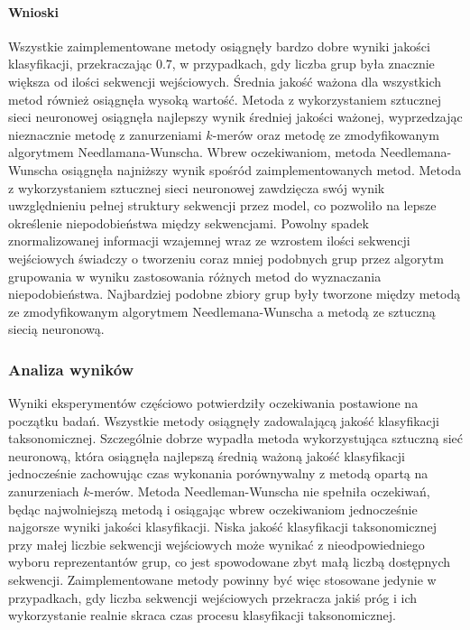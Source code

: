             \paragraph{Wnioski}
                Wszystkie zaimplementowane metody osiągnęły bardzo dobre wyniki jakości klasyfikacji, przekraczając $0.7$, w przypadkach, gdy liczba grup była znacznie większa od ilości sekwencji wejściowych. Średnia jakość ważona dla wszystkich metod również osiągnęła wysoką wartość.
                Metoda z wykorzystaniem sztucznej sieci neuronowej osiągnęła najlepszy wynik średniej jakości ważonej, wyprzedzając nieznacznie metodę z zanurzeniami $k$-merów oraz metodę ze zmodyfikowanym algorytmem Needlamana-Wunscha. Wbrew oczekiwaniom, metoda Needlemana-Wunscha osiągnęła najniższy wynik spośród zaimplementowanych metod.
                Metoda z wykorzystaniem sztucznej sieci neuronowej zawdzięcza swój wynik uwzględnieniu pełnej struktury sekwencji przez model, co pozwoliło na lepsze określenie niepodobieństwa między sekwencjami.
                Powolny spadek znormalizowanej informacji wzajemnej wraz ze wzrostem ilości sekwencji wejściowych świadczy o tworzeniu coraz mniej podobnych grup przez algorytm grupowania w wyniku zastosowania różnych metod do wyznaczania niepodobieństwa. Najbardziej podobne zbiory grup były tworzone między metodą ze zmodyfikowanym algorytmem Needlemana-Wunscha a metodą ze sztuczną siecią neuronową.

        \subsubsection{Analiza wyników}

            Wyniki eksperymentów częściowo potwierdziły oczekiwania postawione na początku badań. Wszystkie metody osiągnęły zadowalającą jakość klasyfikacji taksonomicznej. Szczególnie dobrze wypadła metoda wykorzystująca sztuczną sieć neuronową, która osiągnęła najlepszą średnią ważoną jakość klasyfikacji jednocześnie zachowując czas wykonania porównywalny z metodą opartą na zanurzeniach $k$-merów. Metoda Needleman-Wunscha nie spełniła oczekiwań, będąc najwolniejszą metodą i osiągając wbrew oczekiwaniom jednocześnie najgorsze wyniki jakości klasyfikacji. Niska jakość klasyfikacji taksonomicznej przy małej liczbie sekwencji wejściowych może wynikać z nieodpowiedniego wyboru reprezentantów grup, co jest spowodowane zbyt małą liczbą dostępnych sekwencji. Zaimplementowane metody powinny być więc stosowane jedynie w przypadkach, gdy liczba sekwencji wejściowych przekracza jakiś próg i ich wykorzystanie realnie skraca czas procesu klasyfikacji taksonomicznej.